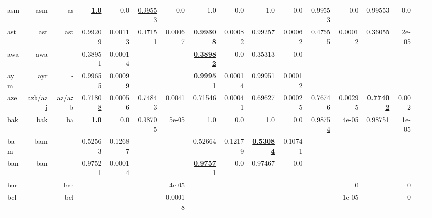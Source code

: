 \documentclass[11pt]{article}
\begin{document}
\begin{table*}[h]
{\begin{tabular}{lrrrrrrrrrrrrrrrr}
asm         & asm         & as         & \textbf{\underline{1.0}}         & 0.0         & \underline{0.99553}         & 0.0         & 1.0         & 0.0         & 1.0         & 0.0         & 0.99553         & 0.0         & 0.99553         & 0.0         \\
ast         & ast         & ast         & 0.99209         & 0.00113         & 0.47151         & 0.00067         & \textbf{\underline{0.99308}}         & 0.00082         & 0.99257         & 0.00062         & \underline{0.47655}         & 0.00012         & 0.36055         & 2e-05         \\
awa         & awa         & -         & 0.38951         & 0.00014         &          &          & \textbf{\underline{0.38982}}         & 0.0         & 0.35313         & 0.0         &          &          &          &          \\
aym         & ayr         & -         & 0.99655         & 0.00099         &          &          & \textbf{\underline{0.99951}}         & 0.00014         & 0.99951         & 0.00012         &          &          &          &          \\
aze         & azb/azj         & az/azb         & \underline{0.71808}         & 0.00056         & 0.74843         & 0.0041         & 0.71546         & 0.00041         & 0.69627         & 0.00025         & 0.76746         & 0.00295         & \textbf{\underline{0.77402}}         & 0.002         \\
bak         & bak         & ba         & \textbf{\underline{1.0}}         & 0.0         & 0.98705         & 5e-05         & 1.0         & 0.0         & 1.0         & 0.0         & \underline{0.98754}         & 4e-05         & 0.98751         & 1e-05         \\
bam         & bam         & -         & 0.52563         & 0.12687         &          &          & 0.52664         & 0.12179         & \textbf{\underline{0.53084}}         & 0.10741         &          &          &          &          \\
ban         & ban         & -         & 0.97521         & 0.00014         &          &          & \textbf{\underline{0.97571}}         & 0.0         & 0.97467         & 0.0         &          &          &          &          \\
bar         & -         & bar         &          &          &          & 4e-05         &          &          &          &          &          & 0         &          & 0         \\
bcl         & -         & bcl         &          &          &          & 0.00018         &          &          &          &          &          & 1e-05         &          & 0         \\

\end{tabular}}
\end{table*}
\end{document}
